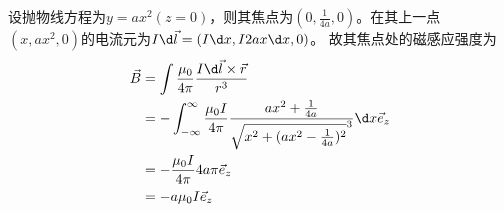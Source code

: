 \documentclass{phyasgn}
\begin{document}
\begin{sol}[3]
  设抛物线方程为$y=ax^2(z=0)$，则其焦点为$(0,\frac{1}{4a},0)$。在其上一点$(x,ax^2,0)$的电流元为$I\d \vec{l}=(I\d x,I2ax\d x,0)$。
  故其焦点处的磁感应强度为
  \begin{align*}
    \vec{B}&=\int\frac{\mu_0}{4\pi}\frac{I\d \vec{l}\times\vec{r}}{r^3}\\
    &=-\int_{-\infty}^{\infty}\frac{\mu_0I}{4\pi}\frac{ax^2+\frac{1}{4a}}{\sqrt{x^2+(ax^2-\frac{1}{4a})^2}^3}\d x\vec{e}_z\\
    &=-\frac{\mu_0I}{4\pi}4a\pi\vec{e}_z\\
    &=-a\mu_0I\vec{e}_z
  \end{align*}
\end{sol}\par
\end{document}
